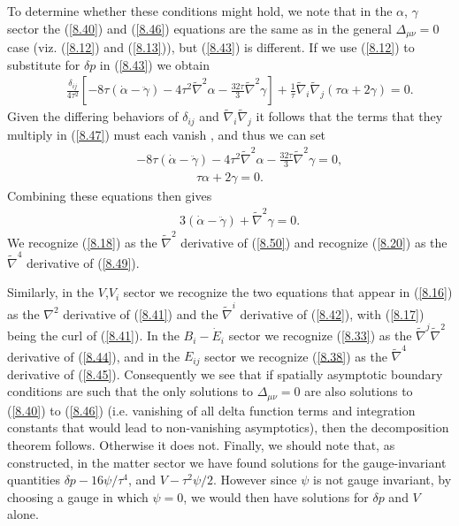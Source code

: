 \documentclass[aps,onecolumn,10pt]{revtex4}
\numberwithin{equation}{section}
\numberwithin{equation}{section}
\begin{document}
To determine whether these conditions might hold, we note that in the $\alpha$, $\gamma$ sector the (\ref{8.40}) and (\ref{8.46})  equations are the same as in the general $\Delta_{\mu\nu}=0$ case (viz. (\ref{8.12}) and (\ref{8.13})), but (\ref{8.43}) is different. If we use (\ref{8.12}) to substitute for $\delta p$ in (\ref{8.43}) we obtain 
%
\begin{eqnarray}
 &&\frac{\delta_{ij}}{4\tau^2}\left[-8\tau(\dot{\alpha}-\ddot{\gamma})-
 4\tau^2\tilde{\nabla}^2\alpha-\frac{32\tau}{3} \tilde{\nabla}^2\gamma\right]+\frac{1}{\tau}\tilde{\nabla}_i\tilde{\nabla}_j(\tau\alpha+2\gamma)=0.
\label{8.47}
\end{eqnarray}
%
Given the differing behaviors of $\delta_{ij}$ and $\tilde{\nabla}_i\tilde{\nabla}_j$ it follows that the terms that they multiply  in (\ref{8.47}) must each vanish \cite{footnote10}, and thus we can set
%
\begin{eqnarray}
 &&-8\tau(\dot{\alpha}-\ddot{\gamma})-
 4\tau^2\tilde{\nabla}^2\alpha-\frac{32\tau}{3} \tilde{\nabla}^2\gamma=0,
 \label{8.48}
 \end{eqnarray}
 \begin{eqnarray}
 \tau\alpha+2\gamma=0.
\label{8.49}
\end{eqnarray}
%
Combining these equations then gives
%
\begin{eqnarray}
 &&3(\dot{\alpha}-\ddot{\gamma})+ \tilde{\nabla}^2\gamma=0.
\label{8.50}
\end{eqnarray}
%
We recognize (\ref{8.18}) as the $\tilde{\nabla}^2$ derivative of (\ref{8.50}) and recognize (\ref{8.20}) as the $\tilde{\nabla}^4$ derivative of (\ref{8.49}).

Similarly, in the $V$,$V_i$ sector we recognize the two equations that appear in (\ref{8.16}) as the $\nabla^2$ derivative of (\ref{8.41}) and the $\tilde{\nabla}^i$ derivative of (\ref{8.42}), with (\ref{8.17}) being the curl of (\ref{8.41}). In the $B_i-\dot{E}_i$ sector we recognize (\ref{8.33}) as the $\tilde{\nabla}^j\tilde{\nabla}^2$ derivative of (\ref{8.44}), and in the $E_{ij}$ sector we recognize (\ref{8.38}) as the $\tilde{\nabla}^4$ derivative of  (\ref{8.45}). Consequently we see that if spatially asymptotic boundary conditions are such that the only solutions to $\Delta_{\mu\nu}=0$ are also solutions to (\ref{8.40}) to (\ref{8.46}) (i.e. vanishing of all delta function terms and integration constants that would lead to non-vanishing asymptotics), then the decomposition theorem follows. Otherwise it does not. Finally, we should note that, as constructed, in the matter sector we have found solutions for the gauge-invariant quantities $\delta p-16\psi/\tau^4$, and $V-\tau^2\psi/2$. However since $\psi$ is not gauge invariant, by choosing a gauge in which $\psi=0$, we would then have solutions for $\delta p$ and $V$ alone.
\end{document}
